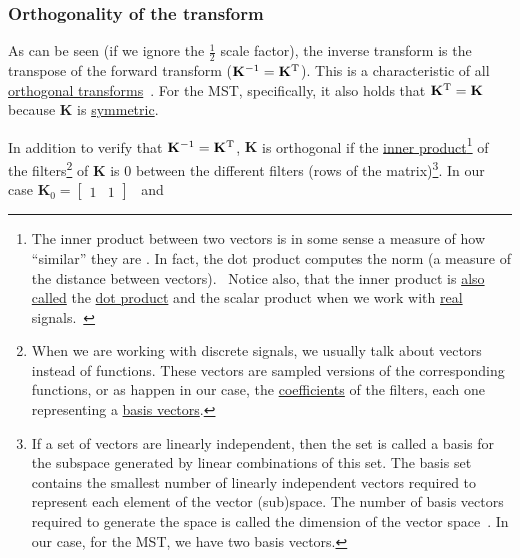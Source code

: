 \subsubsection{Orthogonality of the transform}
As can be seen (if we ignore the $\frac{1}{2}$ scale factor),
the inverse transform is the transpose of the forward transform
(${\mathbf K}^{-1}={\mathbf K}^{\text T}$). This is a characteristic
of all
\href{https://en.wikipedia.org/wiki/Orthogonal_transformation}{orthogonal
  transforms}~\cite{sayood2017introduction}. For the MST,
specifically, it also holds that ${\mathbf K}^{\text T}={\mathbf K}$
because ${\mathbf K}$ is
\href{https://en.wikipedia.org/wiki/Symmetric_matrix}{symmetric}.

In addition to verify that ${\mathbf K}^{-1}={\mathbf K}^{\text T}$,
${\mathbf K}$ is orthogonal if the
\href{https://en.wikipedia.org/wiki/Inner_product_space}{inner
  product}\footnote{The inner product between two vectors is in some
  sense a measure of how ``similar'' they are
  \cite{sayood2017introduction}. In fact, the dot product computes the
  norm (a measure of the distance between
  vectors).~\cite{vetterli2014foundations} Notice also, that the inner
  product is
  \href{https://math.stackexchange.com/questions/476738/difference-between-dot-product-and-inner-product}{also
    called} the \href{https://en.wikipedia.org/wiki/Dot_product}{dot
    product} and the scalar product when we work with
  \href{https://en.wikipedia.org/wiki/Real_number}{real}
  signals.~\cite{vetterli2014foundations}} of the
filters\footnote{When we are working with discrete signals, we usually
  talk about vectors instead of functions. These vectors are sampled
  versions of the corresponding functions, or as happen in our case,
  the
  \href{https://en.wikipedia.org/wiki/Finite_impulse_response}{coefficients}
  of the filters, each one representing a
  \href{https://en.wikipedia.org/wiki/Basis_(linear_algebra)}{basis
    vectors}.} of ${\mathbf K}$ is $0$ between the different filters
(rows of the matrix)\footnote{If a set of vectors are linearly
  independent, then the set is called a basis for the subspace
  generated by linear combinations of this set. The basis set contains
  the smallest number of linearly independent vectors required to
  represent each element of the vector (sub)space. The number of basis
  vectors required to generate the space is called the dimension of
  the vector space~\cite{sayood2017introduction}. In our case, for the
  MST, we have two basis vectors.}. In our case
${\mathbf K}_0=\begin{bmatrix}1 & 1\end{bmatrix}$~ and
